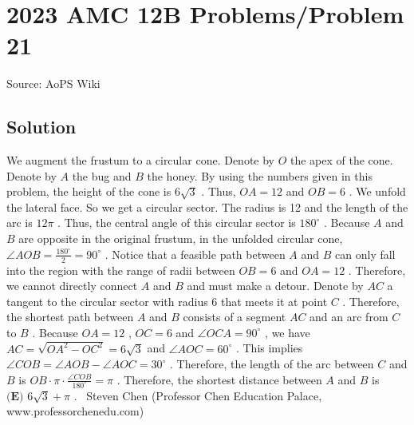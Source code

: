 \documentclass[12pt]{article}
\begin{document}
\section*{{2023 AMC 12B Problems/Problem 21}}
Source: AoPS Wiki

\subsection*{Solution}
We augment the frustum to a circular cone.
Denote by $O$ the apex of the cone.
Denote by $A$ the bug and $B$ the honey. By using the numbers given in this problem, the height of the cone is $6 \sqrt{3}$ .
Thus, $OA = 12$ and $OB = 6$ . We unfold the lateral face. So we get a circular sector.
The radius is 12 and the length of the arc is $12\pi$ .
Thus, the central angle of this circular sector is $180^\circ$ . Because $A$ and $B$ are opposite in the original frustum, in the unfolded circular cone, $\angle AOB = \frac{180^\circ}{2} = 90^\circ$ . Notice that a feasible path between $A$ and $B$ can only fall into the region with the range of radii between $OB = 6$ and $OA = 12$ .
Therefore, we cannot directly connect $A$ and $B$ and must make a detour.
Denote by $AC$ a tangent to the circular sector with radius 6 that meets it at point $C$ .
Therefore, the shortest path between $A$ and $B$ consists of a segment $AC$ and an arc from $C$ to $B$ . Because $OA = 12$ , $OC = 6$ and $\angle OCA = 90^\circ$ , we have $AC = \sqrt{OA^2 - OC^2} = 6 \sqrt{3}$ and $\angle AOC = 60^\circ$ .
This implies $\angle COB = \angle AOB - \angle AOC = 30^\circ$ .
Therefore, the length of the arc between $C$ and $B$ is $OB \cdot \pi \cdot \frac{\angle COB}{180^\circ} = \pi$ .
Therefore, the shortest distance between $A$ and $B$ is $\boxed{\textbf{(E) } 6 \sqrt{3} + \pi}$ . ~Steven Chen (Professor Chen Education Palace, www.professorchenedu.com)
\end{document}
